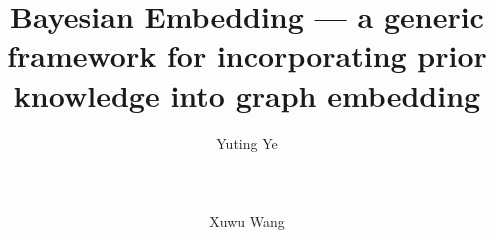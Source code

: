 \documentclass{sigkddExp}
\begin{document}
%

\title{Bayesian Embedding --- a generic framework for incorporating prior knowledge into graph embedding }
%

%


\author{
%
\alignauthor Yuting Ye \\
       \affaddr{~}\\
       \affaddr{~}\\
       \affaddr{~}\\
       \email{~}
\alignauthor Xuwu Wang\\
       \affaddr{~}\\
       \affaddr{~}\\
       \affaddr{~}\\
       \email{~}
}     
\end{document}
